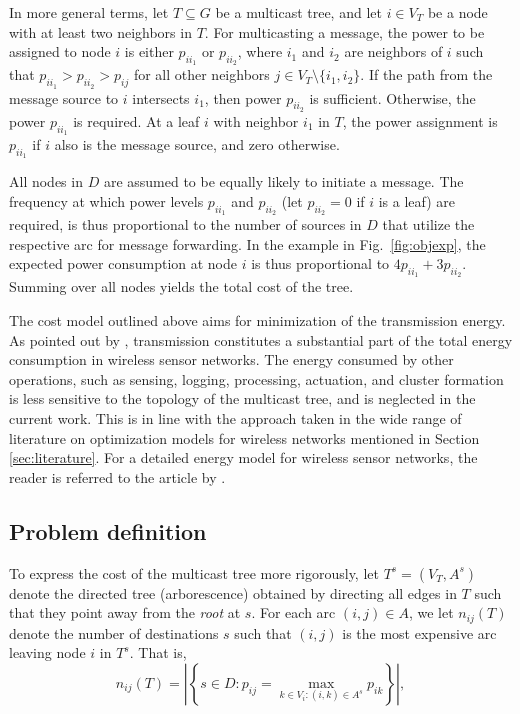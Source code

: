 In more general terms, let $T\subseteq G$ be a multicast tree, and let $i\in V_T$ be a node with at least two neighbors in $T$.
For multicasting a message, the power to be assigned to node $i$ is either $p_{ii_1}$ or $p_{ii_2}$, where $i_1$ and $i_2$ are neighbors of $i$ such that
$p_{ii_1}>p_{ii_2}>p_{ij}$ for all other neighbors $j\in V_T\setminus\{i_1,i_2\}$.
If the path from the message source to $i$ intersects $i_1$, then power $p_{ii_2}$ is sufficient.
Otherwise, the power $p_{ii_1}$ is required.
At a leaf $i$ with neighbor $i_1$ in $T$, the power assignment is $p_{ii_1}$ if $i$ also is the message source, and zero otherwise.

All nodes in $D$ are assumed to be equally likely to initiate a message.
The frequency at which power levels $p_{ii_1}$ and $p_{ii_2}$ (let $p_{ii_2}=0$ if $i$ is a leaf) are required,
is thus proportional to the number of sources in $D$ that utilize the respective arc for message forwarding.
In the example in Fig.\ \ref{fig:objexp}, the expected power consumption at node $i$ is thus proportional to $4p_{ii_1} + 3p_{ii_2}$.
Summing over all nodes yields the total cost of the tree.

The cost model outlined above aims for minimization of the transmission energy.
As pointed out by \citet{halgamuge}, transmission constitutes a substantial part of the total energy consumption in wireless sensor networks.
The energy consumed by other operations, such as sensing, logging, processing, actuation, and cluster formation is less sensitive to the topology
of the multicast tree, and is neglected in the current work.
This is in line with the approach taken in the wide range of literature on optimization models for wireless networks mentioned in Section \ref{sec:literature}.
For a detailed energy model for wireless sensor networks, the reader is referred to the article by \citet{halgamuge}.

\subsection{Problem definition} \label{sec:probdef}

To express the cost of the multicast tree more rigorously, let $T^s=(V_T,A^s)$ denote the directed tree (arborescence) obtained by directing all edges in $T$ such that they point away from the \emph{root} at $s$.
For each arc $(i,j)\in A$, we let $n_{ij}(T)$ denote the number of destinations $s$ such that $(i,j)$ is the most expensive arc leaving node $i$ in $T^s$.
That is,
\[
  n_{ij}(T) = \left|\left\{s\in D: p_{ij}=\max_{k\in V_i: (i,k)\in A^s}p_{ik}\right\}\right|,
\]

